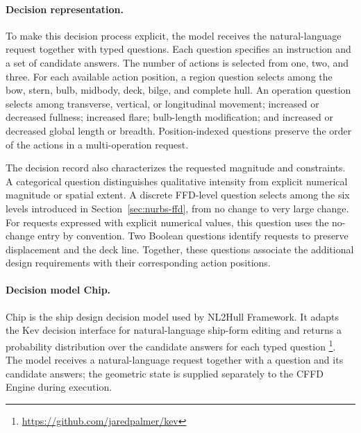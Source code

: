 \documentclass[a4paper,fleqn]{cas-dc}
\begin{document}
\paragraph{Decision representation.}
To make this decision process explicit, the model receives the natural-language
request together with typed questions. Each question specifies an instruction and
a set of candidate answers. The number of actions is selected from one, two, and
three. For each available action position, a region question selects among the
bow, stern, bulb, midbody, deck, bilge, and complete hull. An operation question
selects among transverse, vertical, or longitudinal movement; increased or
decreased fullness; increased flare; bulb-length modification; and increased or
decreased global length or breadth. Position-indexed questions preserve the
order of the actions in a multi-operation request.

The decision record also characterizes the requested magnitude and constraints.
A categorical question distinguishes qualitative intensity from explicit
numerical magnitude or spatial extent. A discrete FFD-level question selects
among the six levels introduced in Section~\ref{sec:nurbs-ffd}, from no change to
very large change. For requests expressed with explicit numerical values, this
question uses the no-change entry by convention. Two Boolean questions identify
requests to preserve displacement and the deck line. Together, these questions
associate the additional design requirements with their corresponding action
positions.

\paragraph{Decision model Chip.}
Chip is the ship design decision model used by NL2Hull Framework. It adapts the
Kev decision interface for natural-language ship-form editing and returns a
probability distribution over the candidate answers for each typed question
\footnote{\url{https://github.com/jaredpalmer/kev}}. The model receives a
natural-language request together with a question and its candidate answers; the
geometric state is supplied separately to the CFFD Engine during execution.
\end{document}
